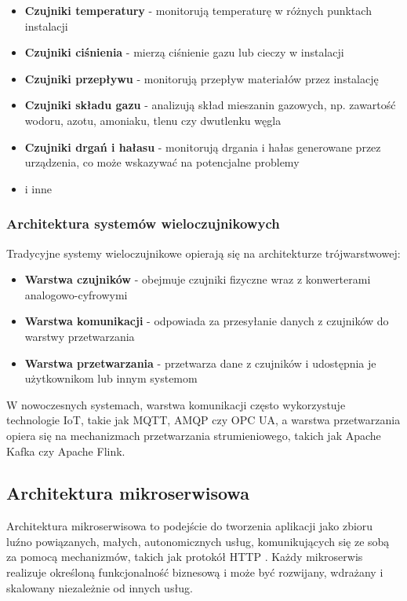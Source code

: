 \begin{itemize}
    \item \textbf{Czujniki temperatury} - monitorują temperaturę w różnych punktach instalacji
    \item \textbf{Czujniki ciśnienia} - mierzą ciśnienie gazu lub cieczy w instalacji
    \item \textbf{Czujniki przepływu} - monitorują przepływ materiałów przez instalację
    \item \textbf{Czujniki składu gazu} - analizują skład mieszanin gazowych, np. zawartość wodoru, azotu, amoniaku, tlenu czy dwutlenku węgla
    \item \textbf{Czujniki drgań i hałasu} - monitorują drgania i hałas generowane przez urządzenia, co może wskazywać na potencjalne problemy
    \item i inne
\end{itemize}

\subsubsection{Architektura systemów wieloczujnikowych}
\label{subsubsec:architektura_systemow}

Tradycyjne systemy wieloczujnikowe opierają się na architekturze trójwarstwowej:

\begin{itemize}
    \item \textbf{Warstwa czujników} - obejmuje czujniki fizyczne wraz z konwerterami analogowo-cyfrowymi
    \item \textbf{Warstwa komunikacji} - odpowiada za przesyłanie danych z czujników do warstwy przetwarzania
    \item \textbf{Warstwa przetwarzania} - przetwarza dane z czujników i udostępnia je użytkownikom lub innym systemom
\end{itemize}

W nowoczesnych systemach, warstwa komunikacji często wykorzystuje technologie IoT, takie jak MQTT, AMQP czy OPC UA,
a warstwa przetwarzania opiera się na mechanizmach przetwarzania strumieniowego, takich jak Apache Kafka czy Apache Flink.


\subsection{Architektura mikroserwisowa}
\label{subsec:architektura_mikroserwisowa}

Architektura mikroserwisowa to podejście do tworzenia aplikacji jako zbioru luźno powiązanych, małych, autonomicznych usług,
komunikujących się ze sobą za pomocą mechanizmów, takich jak protokół HTTP \citep{microservice_architecture}.
Każdy mikroserwis realizuje określoną funkcjonalność biznesową i może być rozwijany, wdrażany i skalowany niezależnie od innych usług.

